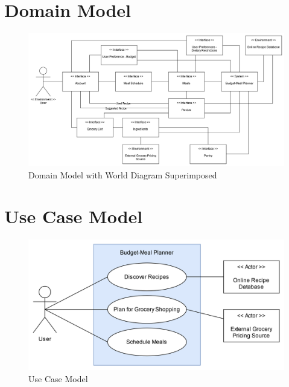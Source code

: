 \documentclass[11pt, letterpaper]{report}
\begin{document}
\chapter{Domain Model}
\begin{figure}[h]
    \centering
    \includegraphics[width=\textwidth]{images/Domain_Model.png}
    \caption{Domain Model with World Diagram Superimposed}
\end{figure}

\chapter{Use Case Model}
\begin{figure}[h]
    \centering
    \includegraphics[width=\textwidth]{images/Use_Case.png}
    \caption{Use Case Model}
\end{figure}
\end{document}
